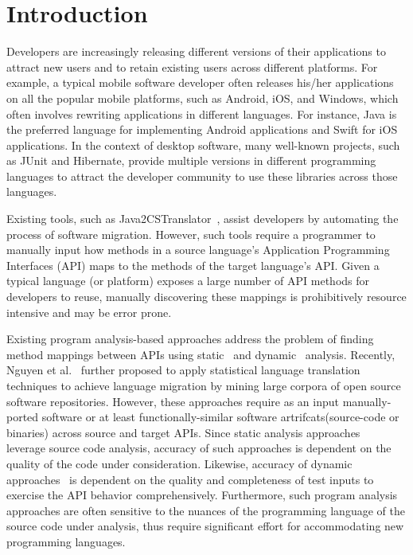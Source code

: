 \section{Introduction}
\label{sec:introduction}


Developers are increasingly releasing different versions of their applications to attract new users and to retain existing users across different platforms.
For example, a typical mobile software developer often releases his/her applications
on all the popular mobile platforms, such as Android, iOS, and Windows,
which often involves rewriting applications in different languages.
For instance, Java is the preferred language for implementing Android applications
and Swift for iOS applications.
In the context of desktop software, many well-known projects, such as JUnit and
Hibernate, provide multiple versions in different programming languages
to attract the developer community to use these
libraries across those languages.



Existing tools, such as Java2CSTranslator~\cite{java2cstranslator},
assist developers by automating the process of software migration.
However, such tools require a programmer to manually input
how methods in a source language's Application Programming Interfaces (API) maps to the methods of the target language's API. 
Given a typical language (or platform) exposes a large number of API methods for developers to reuse, manually discovering these mappings is prohibitively resource intensive and may be error prone.


Existing program analysis-based approaches
address the problem of finding method mappings between APIs using
static~\cite{Zhong2010ICSE} and dynamic~\cite{Gokhale2013ICSE} analysis. 
Recently, Nguyen et al.~\cite{nguyen2014statistical} further proposed to
apply statistical language translation techniques to achieve language migration
by mining large corpora of open source software repositories.
However, these approaches require as an input manually-ported software
or at least functionally-similar software artrifcats(source-code or binaries)
across source and target APIs.
Since static analysis approaches~\cite{Zhong2010ICSE,nguyen2014statistical}
leverage source code analysis, 
accuracy of such approaches is dependent on the quality of the code under consideration.
Likewise, accuracy of dynamic approaches~\cite{Gokhale2013ICSE} is dependent on
the quality and completeness of test inputs
to exercise the API behavior comprehensively. 
Furthermore, such program analysis approaches are often sensitive to the nuances of
the programming language of the source code under analysis, thus require significant effort
for accommodating new programming languages.  


